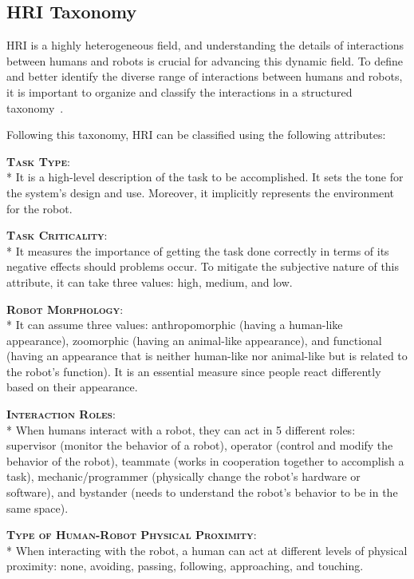 \subsection{HRI Taxonomy}\label{subsec:hri_taxonomy}
HRI is a highly heterogeneous field, and understanding the details of interactions between humans and robots is crucial for advancing this dynamic field. 
To define and better identify the diverse range of interactions between humans and robots, 
it is important to organize and classify the interactions in a structured taxonomy~\cite{yanco2004taxonomy}.

Following this taxonomy, HRI can be classified using the following attributes:

{\bfseries \scshape Task Type}:\\*
It is a high-level description of the task to be accomplished. It sets the tone for the system's design and use. 
Moreover, it implicitly represents the environment for the robot.

{\bfseries \scshape Task Criticality}:\\*
It measures the importance of getting the task done correctly in terms of its negative effects should problems occur. 
To mitigate the subjective nature of this attribute, it can take three values: high, medium, and low.

{\bfseries \scshape Robot Morphology}:\\*
It can assume three values: anthropomorphic (having a human-like appearance), zoomorphic (having an animal-like appearance), 
and functional (having an appearance that is neither human-like nor animal-like but is related to the robot's function).
It is an essential measure since people react differently based on their appearance.

{\bfseries \scshape Interaction Roles}:\\*
When humans interact with a robot, they can act in 5 different roles: supervisor (monitor the behavior of a robot), 
operator (control and modify the behavior of the robot), teammate (works in cooperation together to accomplish a task), 
mechanic/programmer (physically change the robot's hardware or software), and bystander 
(needs to understand the robot's behavior to be in the same space).

{\bfseries \scshape Type of Human-Robot Physical Proximity}:\\*
When interacting with the robot, a human can act at different levels of physical proximity: none, avoiding, passing, 
following, approaching, and touching.

